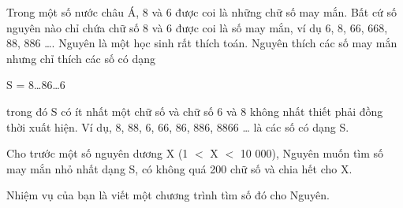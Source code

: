 Trong một số nước châu Á, 8 và 6 được coi là những chữ số may mắn. Bất cứ số nguyên nào chỉ chứa chữ số 8 và 6 được coi là số may mắn, ví dụ 6, 8, 66, 668, 88, 886 …. Nguyên là một học sinh rất thích toán. Nguyên thích các số may mắn nhưng chỉ thích các số có dạng  

   S = 8…86…6  

   trong đó S có ít nhất một chữ số và chữ số 6 và 8 không nhất thiết phải đồng thời xuất hiện. Ví dụ, 8, 88, 6, 66, 86, 886, 8866 … là các số có dạng S.  

   Cho trước một số nguyên dương X (1 $<$ X $<$ 10 000), Nguyên muốn tìm số may mắn nhỏ nhất dạng S, có không quá 200 chữ số và chia hết cho X.  

   Nhiệm vụ của bạn là viết một chương trình tìm số đó cho Nguyên.  

\